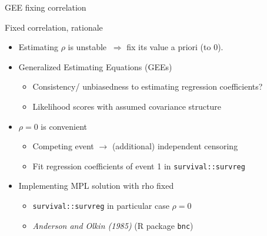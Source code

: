 \documentclass[10pt]{beamer}
\providecommand{\tightlist}{%
\setlength{\itemsep}{0pt}\setlength{\parskip}{0pt}}
\begin{document}
\begin{frame}[fragile]{GEE fixing correlation}
\protect\hypertarget{fixed-correlation-a-la-gee}{}

\begin{block}{Fixed correlation, rationale}

\begin{itemize}
\tightlist
\item
  Estimating \(\rho\) is unstable \(\ \Rightarrow\) fix its value a priori (to 0).
    \item
    Generalized Estimating Equations (GEEs)

    \begin{itemize}
      \tightlist
      \item
      Consistency/ unbiasedness to estimating regression coefficients?
      \item
      Likelihood scores with assumed covariance structure
    \end{itemize}
\item
  \(\rho=0\) is convenient


  \begin{itemize}
  \tightlist
  \item
    Competing event \(\to\) (additional) independent censoring
  \item
    Fit regression coefficients of event 1 in
    \texttt{survival::survreg}
\end{itemize}
\end{itemize}
\end{block}

\begin{itemize}
\tightlist
\item
  Implementing MPL solution with rho fixed
  \begin{itemize}
      \item \texttt{survival::survreg} in particular case $\rho=0$
      \item \textit{Anderson and Olkin (1985)} (R package \texttt{bnc})
  \end{itemize}
\end{itemize}

\end{frame}
\end{document}
